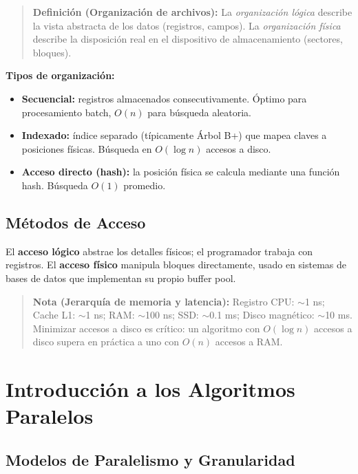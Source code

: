 \documentclass[12pt, letterpaper]{article}
\begin{document}
	\begin{quote}
		\textbf{Definición (Organización de archivos):}
		La \textit{organización lógica} describe la vista abstracta de los datos (registros, campos). La \textit{organización física} describe la disposición real en el dispositivo de almacenamiento (sectores, bloques).
	\end{quote}
	
	\textbf{Tipos de organización:}
	\begin{itemize}[noitemsep]
		\item \textbf{Secuencial:} registros almacenados consecutivamente. Óptimo para procesamiento batch, $O(n)$ para búsqueda aleatoria.
		\item \textbf{Indexado:} índice separado (típicamente Árbol B+) que mapea claves a posiciones físicas. Búsqueda en $O(\log n)$ accesos a disco.
		\item \textbf{Acceso directo (hash):} la posición física se calcula mediante una función hash. Búsqueda $O(1)$ promedio.
	\end{itemize}
	
	\subsection{Métodos de Acceso}
	
	El \textbf{acceso lógico} abstrae los detalles físicos; el programador trabaja con registros. El \textbf{acceso físico} manipula bloques directamente, usado en sistemas de bases de datos que implementan su propio buffer pool.
	
	\begin{quote}
		\textbf{Nota (Jerarquía de memoria y latencia):}
		Registro CPU: $\sim$1 ns; Cache L1: $\sim$1 ns; RAM: $\sim$100 ns; SSD: $\sim$0.1 ms; Disco magnético: $\sim$10 ms. Minimizar accesos a disco es crítico: un algoritmo con $O(\log n)$ accesos a disco supera en práctica a uno con $O(n)$ accesos a RAM.
	\end{quote}
	
	\section{Introducción a los Algoritmos Paralelos}
	
	\subsection{Modelos de Paralelismo y Granularidad}
	
\end{document}
